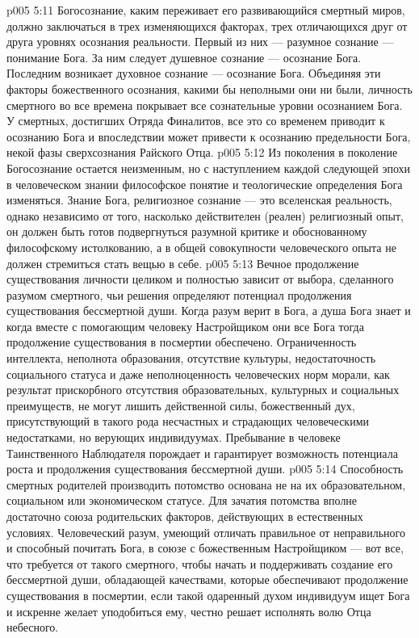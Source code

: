 \vs p005 5:11 \pc Богосознание, каким переживает его развивающийся смертный миров, должно заключаться в трех изменяющихся факторах, трех отличающихся друг от друга уровнях осознания реальности. Первый из них --- разумное сознание --- понимание  Бога. За ним следует душевное сознание --- осознание  Бога. Последним возникает духовное сознание --- осознание  Бога. Объединяя эти факторы божественного осознания, какими бы неполными они ни были, личность смертного во все времена покрывает все сознательные уровни осознанием  Бога. У смертных, достигших Отряда Финалитов, все это со временем приводит к осознанию  Бога и впоследствии может привести к осознанию предельности Бога, некой фазы  сверхсознания Райского Отца.
\vs p005 5:12 Из поколения в поколение Богосознание остается неизменным, но с наступлением каждой следующей эпохи в человеческом знании философское понятие и теологические определения Бога  изменяться. Знание Бога, религиозное сознание --- это вселенская реальность, однако независимо от того, насколько действителен (реален) религиозный опыт, он должен быть готов подвергнуться разумной критике и обоснованному философскому истолкованию, а в общей совокупности человеческого опыта не должен стремиться стать вещью в себе.
\vs p005 5:13 \pc Вечное продолжение существования личности целиком и полностью зависит от выбора, сделанного разумом смертного, чьи решения определяют потенциал продолжения существования бессмертной души. Когда разум верит в Бога, а душа Бога знает и когда вместе с помогающим человеку Настройщиком они все Бога  тогда продолжение существования в посмертии обеспечено. Ограниченность интеллекта, неполнота образования, отсутствие культуры, недостаточность социального статуса и даже неполноценность человеческих норм морали, как результат прискорбного отсутствия образовательных, культурных и социальных преимуществ, не могут лишить действенной силы, божественный дух, присутствующий в такого рода несчастных и страдающих человеческими недостатками, но верующих индивидуумах. Пребывание в человеке Таинственного Наблюдателя порождает и гарантирует возможность потенциала роста и продолжения существования бессмертной души.
\vs p005 5:14 Способность смертных родителей производить потомство основана не на их образовательном, социальном или экономическом статусе. Для зачатия потомства вполне достаточно союза родительских факторов, действующих в естественных условиях. Человеческий разум, умеющий отличать правильное от неправильного и способный почитать Бога, в союзе с божественным Настройщиком --- вот все, что требуется от такого смертного, чтобы начать и поддерживать создание его бессмертной души, обладающей качествами, которые обеспечивают продолжение существования в посмертии, если такой одаренный духом индивидуум ищет Бога и искренне желает уподобиться ему, честно решает исполнять волю Отца небесного.
